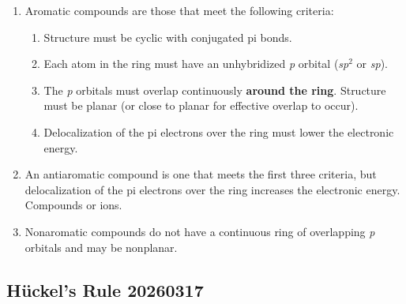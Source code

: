\begin{enumerate}
    \item Aromatic compounds are those that meet the following criteria:
    \begin{enumerate}
        \item Structure must be cyclic with conjugated pi bonds.
        \item Each atom in the ring must have an unhybridized \textit{p} orbital (\textit{sp}$ ^2 $ or \textit{sp}).
        \item The \textit{p} orbitals must overlap continuously \textbf{around the ring}. Structure must be planar (or close to planar for effective overlap to occur).
        \item Delocalization of the pi electrons over the ring must lower the electronic energy.
    \end{enumerate}
    \item An antiaromatic compound is one that meets the first three criteria, but delocalization of the pi electrons over the ring increases the electronic energy. Compounds or ions.
    \item Nonaromatic compounds do not have a continuous ring of overlapping \textit{p} orbitals and may be nonplanar.
\end{enumerate}

\subsection{Hückel’s Rule 20260317}

